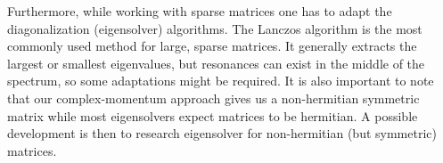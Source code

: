 \documentclass[../main/report.tex]{subfiles}
\begin{document}
Furthermore, while working with sparse matrices one has to adapt the diagonalization (eigensolver) algorithms. 
The Lanczos algorithm is the most commonly used method for large, sparse matrices.
It generally extracts the largest or smallest eigenvalues, but resonances can exist in the middle of the spectrum, so some adaptations might be required.
It is also important to note that our complex-momentum approach gives us a non-hermitian symmetric matrix while most eigensolvers expect matrices to be hermitian. A possible development is then to research eigensolver for non-hermitian (but symmetric) matrices.
\end{document}
